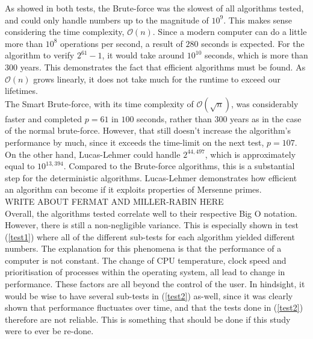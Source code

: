 \documentclass[main.tex]{subfiles}
\begin{document}

As showed in both tests, the Brute-force was the slowest of all algorithms
tested, and could only handle numbers up to the magnitude of $10^{9}$. This
makes sense considering the time complexity, $\mathcal{O}(n)$. Since a modern
computer can do a little more than $10^{8}$ operations per second, a result of
$280$ seconds is expected. For the algorithm to verify $2^{61}-1$, it would take
around $10^{10}$ seconds, which is more than $300$ years. This demonstrates the
fact that efficient algorithms must be found. As $\mathcal{O}(n)$ grows
linearly, it does not take much for the runtime to exceed our lifetimes. \\

The Smart Brute-force, with its time complexity of $\mathcal{O}(\sqrt{n})$, was
considerably faster and completed $p=61$ in $100$ seconds, rather than $300$
years as in the case of the normal brute-force. However, that still doesn't
increase the algorithm's performance by much, since it exceeds the time-limit on
the next test, $p=107$. \\

On the other hand, Lucas-Lehmer could handle $2^{44,497}$, which is approximately
equal to $10^{13,394}$. Compared to the Brute-force algorithms, this is a
substantial step for the deterministic algorithms. Lucas-Lehmer demonstrates
how efficient an algorithm can become if it exploits properties of Mersenne primes. \\

WRITE ABOUT FERMAT AND MILLER-RABIN HERE \\

Overall, the algorithms tested correlate well to their respective Big O
notation. However, there is still a non-negligible variance. This is especially
shown in test (\ref{test1}) where all of the different sub-tests for each
algorithm yielded different numbers. The explanation for this phenomena is that
the performance of a computer is not constant. The change of CPU temperature,
clock speed and prioritisation of processes within the operating system, all
lead to change in performance. These factors are all beyond the control of the
user. In hindsight, it would be wise to have several sub-tests in (\ref{test2})
as-well, since it was clearly shown that performance fluctuates over time, and
that the tests done in (\ref{test2}) therefore are not reliable. This is
something that should be done if this study were to ever be re-done. \\
\end{document}
